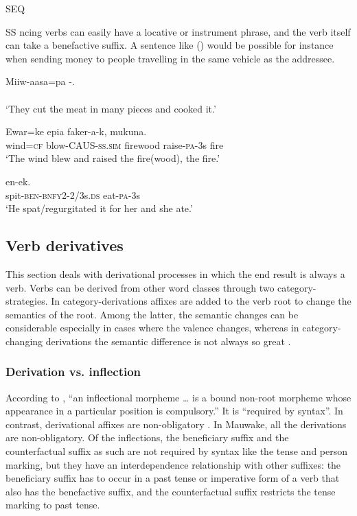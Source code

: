 SEQ 
 
 SS 
 ncing verbs can easily have a locative or instrument phrase, and the verb itself can take a benefactive suffix. A sentence like () would be possible for instance when sending money to people travelling in the same vehicle as the addressee. 

\ea%
\label{ex:x338}
\gll Miiw-aasa=pa -. \\ \\
\glt`They cut the meat in many pieces and cooked it.'
\z

\ea%
\label{ex:x186}
\gll Ewar=ke  epia faker-a-k, mukuna. \\
wind=\textsc{cf} blow-CAUS-\textsc{ss}.\textsc{sim} firewood raise-\textsc{pa}-3s fire \\
\glt`The wind blew and raised the fire(wood), the fire.' 
\z

\ea%
\label{ex:x187}
\gll {} en-ek. \\
spit-\textsc{ben}-\textsc{bnfy}2-2/3s.\textsc{ds} eat-\textsc{pa}-3s \\
\glt`He spat/regurgitated it for her and she ate.'
\z

\subsection{Verb derivatives}
{}
This section deals with derivational processes in which the end result is always a verb. Verbs can be derived from other word classes through two category- strategies. In category-derivations affixes are added to the verb root to change the semantics of the root. Among the latter, the semantic changes can be considerable especially in cases where the valence changes, whereas in category-changing derivations the semantic difference is not always so great \citep[83]{Bybee1985}. 

\subsubsection[Derivation vs. inflection]{Derivation vs. inflection}
{}
According to \citet[81]{Bybee1985}, ``{an inflectional morpheme {\dots} is a bound non-root morpheme whose appearance in a particular position is compulsory}.'' It is ``{required by syntax}''. In contrast, derivational affixes are non-obligatory \citep[191]{Greenberg1954}. In Mauwake, all the derivations are non-obligatory. Of the inflections, the beneficiary suffix and the counterfactual suffix as such are not required by syntax like the tense and person marking, but they have an interdependence relationship with other suffixes: the beneficiary suffix has to occur in a past tense or imperative form of a verb that also has the benefactive suffix, and the counterfactual suffix restricts the tense marking to past tense.

